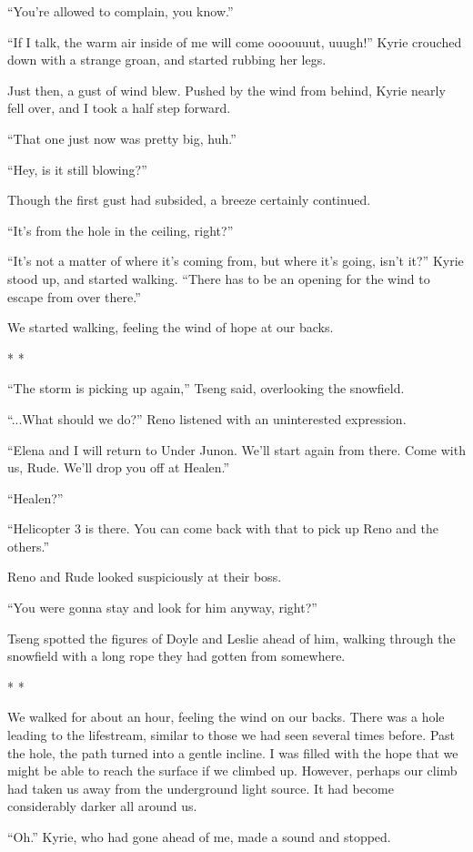 \documentclass[oneside]{book}
\begin{document}
“You’re allowed to complain, you know.”

“If I talk, the warm air inside of me will come oooouuut, uuugh!” Kyrie crouched down with a strange groan, and started rubbing her legs.

Just then, a gust of wind blew. Pushed by the wind from behind, Kyrie nearly fell over, and I took a half step forward.

“That one just now was pretty big, huh.”

“Hey, is it still blowing?”

Though the first gust had subsided, a breeze certainly continued.

“It’s from the hole in the ceiling, right?”

“It’s not a matter of where it’s coming from, but where it’s going, isn’t it?” Kyrie stood up, and started walking. “There has to be an opening for the wind to escape from over there.”

We started walking, feeling the wind of hope at our backs.

* *

“The storm is picking up again,” Tseng said, overlooking the snowfield.

“...What should we do?” Reno listened with an uninterested expression.

“Elena and I will return to Under Junon. We’ll start again from there. Come with us, Rude. We’ll drop you off at Healen.”

“Healen?”

“Helicopter 3 is there. You can come back with that to pick up Reno and the others.”

Reno and Rude looked suspiciously at their boss.

“You were gonna stay and look for him anyway, right?”

Tseng spotted the figures of Doyle and Leslie ahead of him, walking through the snowfield with a long rope they had gotten from somewhere.

* *

We walked for about an hour, feeling the wind on our backs. There was a hole leading to the lifestream, similar to those we had seen several times before. Past the hole, the path turned into a gentle incline. I was filled with the hope that we might be able to reach the surface if we climbed up. However, perhaps our climb had taken us away from the underground light source. It had become considerably darker all around us.

“Oh.” Kyrie, who had gone ahead of me, made a sound and stopped.
\end{document}
